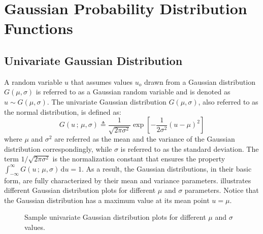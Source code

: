 \graphicspath{{figs/App-GaDiss/}}
\chapter{Gaussian Probability Distribution Functions}
\label{app:gaDiss}

\section{Univariate Gaussian Distribution}

A random variable $u$ that assumes values $u_o$ drawn from a Gaussian distribution $G(\mu,\sigma)$ is referred to as a Gaussian random variable and is denoted as $u \sim G(\mu,\sigma)$.
The univariate Gaussian distribution $G(\mu,\sigma)$, also referred to as the normal distribution, is defined as:
\begin{equation}
	G(u\,;\,\mu,\sigma) \triangleq \frac{1}{\sqrt{2\pi\sigma^2}} \exp\left[-\frac{1}{2\sigma^2}(u-\mu)^2\right]
	\label{eqn:gassDisUnivar}
\end{equation}
where $\mu$ and $\sigma^2$ are referred  as the mean and the variance of the Gaussian distribution correspondingly, while $\sigma$ is referred to as the standard deviation.
The term $1/\sqrt{2\pi\sigma^2}$ is the normalization constant that ensures the property $\int_{-\infty}^{\infty} G(u\,;\,\mu,\sigma)\, \mathrm{d}u = 1$.
As a result, the Gaussian distributions, in their basic form, are fully characterized by their mean and variance parameters.
 illustrates different Gaussian distribution plots for different $\mu$ and $\sigma$ parameters.
Notice that the Gaussian distribution has a maximum value at its mean point $u=\mu$.
\begin{figure}
	\caption[Sample univariate Gaussian distribution plots.]{Sample univariate Gaussian distribution plots for different $\mu$ and $\sigma$ values.}
	\label{fig:gauPlot}
\end{figure}


